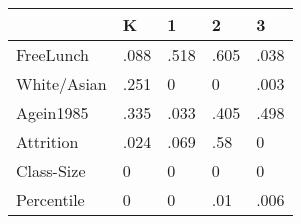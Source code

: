 \documentclass[a4paper,11pt]{article}
\begin{document}
\begin{table}[htbp]
	\begin{tabular}{lllll} \hline \hline
		& K  & 1  & 2  & 3  \\  \hline 
		FreeLunch & .088 & .518 & .605 & .038 \\  
		White/Asian & .251 & 0 & 0 & .003 \\  
		Agein1985 & .335 & .033 & .405 & .498 \\  
		Attrition & .024 & .069 & .58 & 0 \\  
		Class-Size & 0 & 0 & 0 & 0 \\  
		Percentile & 0 & 0 & .01 & .006 \\  
		\hline \hline \end{tabular}
\end{table}
\end{document}
